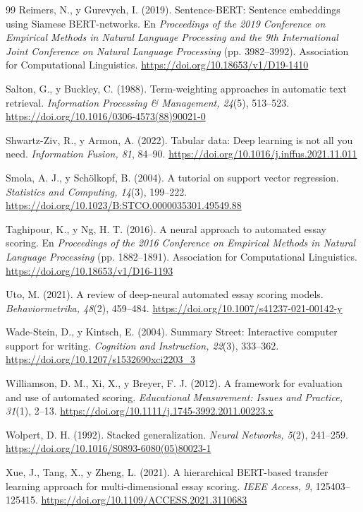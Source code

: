 \documentclass[11pt,a4paper]{article}
\begin{document}
\begin{thebibliography}{99}
Reimers, N., y Gurevych, I. (2019). Sentence-BERT: Sentence embeddings using Siamese BERT-networks. En \textit{Proceedings of the 2019 Conference on Empirical Methods in Natural Language Processing and the 9th International Joint Conference on Natural Language Processing} (pp. 3982--3992). Association for Computational Linguistics. \url{https://doi.org/10.18653/v1/D19-1410}

Salton, G., y Buckley, C. (1988). Term-weighting approaches in automatic text retrieval. \textit{Information Processing \& Management, 24}(5), 513--523. \url{https://doi.org/10.1016/0306-4573(88)90021-0}

Shwartz-Ziv, R., y Armon, A. (2022). Tabular data: Deep learning is not all you need. \textit{Information Fusion, 81}, 84--90. \url{https://doi.org/10.1016/j.inffus.2021.11.011}

Smola, A. J., y Sch{\"o}lkopf, B. (2004). A tutorial on support vector regression. \textit{Statistics and Computing, 14}(3), 199--222. \url{https://doi.org/10.1023/B:STCO.0000035301.49549.88}

Taghipour, K., y Ng, H. T. (2016). A neural approach to automated essay scoring. En \textit{Proceedings of the 2016 Conference on Empirical Methods in Natural Language Processing} (pp. 1882--1891). Association for Computational Linguistics. \url{https://doi.org/10.18653/v1/D16-1193}

Uto, M. (2021). A review of deep-neural automated essay scoring models. \textit{Behaviormetrika, 48}(2), 459--484. \url{https://doi.org/10.1007/s41237-021-00142-y}

Wade-Stein, D., y Kintsch, E. (2004). Summary Street: Interactive computer support for writing. \textit{Cognition and Instruction, 22}(3), 333--362. \url{https://doi.org/10.1207/s1532690xci2203_3}

Williamson, D. M., Xi, X., y Breyer, F. J. (2012). A framework for evaluation and use of automated scoring. \textit{Educational Measurement: Issues and Practice, 31}(1), 2--13. \url{https://doi.org/10.1111/j.1745-3992.2011.00223.x}

Wolpert, D. H. (1992). Stacked generalization. \textit{Neural Networks, 5}(2), 241--259. \url{https://doi.org/10.1016/S0893-6080(05)80023-1}

Xue, J., Tang, X., y Zheng, L. (2021). A hierarchical BERT-based transfer learning approach for multi-dimensional essay scoring. \textit{IEEE Access, 9}, 125403--125415. \url{https://doi.org/10.1109/ACCESS.2021.3110683}

\end{thebibliography}
\end{document}
